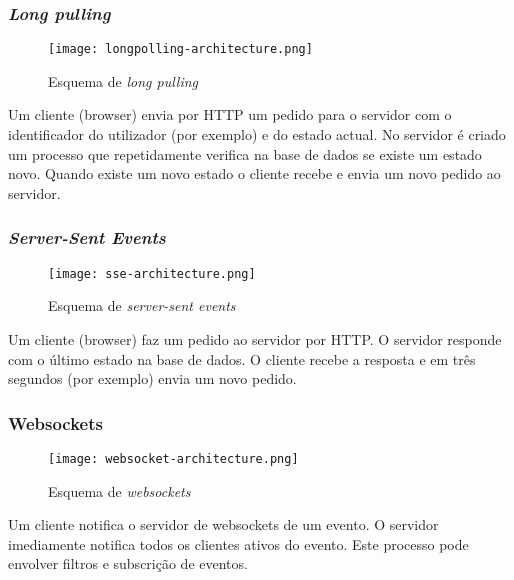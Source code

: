 \subsubsection{\textit{Long pulling}}

\begin{figure}[H]
\centering
\texttt{[image: longpolling-architecture.png]}
\caption{Esquema de \textit{long pulling}}
\label{fig:long_pulling}
\end{figure}

Um cliente (browser) envia por HTTP um pedido para o servidor com o identificador do utilizador (por exemplo) e do estado actual. No servidor é criado um processo que repetidamente verifica na base de dados se existe um estado novo. Quando existe um novo estado o cliente recebe e envia um novo pedido ao servidor.

\subsubsection{\textit{Server-Sent Events}}

\begin{figure}[H]
\centering
\texttt{[image: sse-architecture.png]}
\caption{Esquema de \textit{server-sent events}}
\label{fig:long_pulling}
\end{figure}

Um cliente (browser) faz um pedido ao servidor por HTTP. O servidor responde com o último estado na base de dados. O cliente recebe a resposta e em três segundos (por exemplo) envia um novo pedido.

\subsubsection{Websockets}

\begin{figure}[H]
\centering
\texttt{[image: websocket-architecture.png]}
\caption{Esquema de \textit{websockets}}
\label{fig:long_pulling}
\end{figure}

Um cliente notifica o servidor de websockets de um evento. O servidor imediamente notifica todos os clientes ativos do evento. Este processo pode envolver filtros e subscrição de eventos.